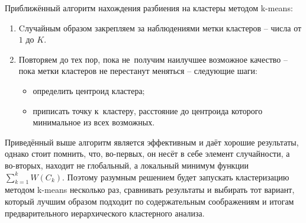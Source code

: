 \documentclass[12pt,a4paper]{article}
\theoremstyle{definition}
\begin{document}
Приближённый алгоритм нахождения разбиения на кластеры методом k-means:

\begin{enumerate}
\item Cлучайным образом закрепляем за наблюдениями метки 
кластеров -- числа от $1$ до $K$. 
\item Повторяем до тех пор, пока не~получим наилучшее возможное качество -- пока 
метки кластеров не перестанут меняться -- следующие шаги:

\begin{itemize}
\item определить центроид кластера;
\item приписать точку к~кластеру, расстояние до центроида 
которого минимальное из всех возможных. 
\end{itemize}
\end{enumerate}

Приведённый выше алгоритм является эффективным и 
даёт хорошие результаты, однако стоит помнить, что, во-первых, 
он несёт в себе элемент случайности, а во-вторых, находит не глобальный, 
а локальный минимум функции $\sum^k_{k=1} W(C_k)$. Поэтому 
разумным решением будет запускать кластеризацию методом k-means 
несколько раз, сравнивать результаты и выбирать тот вариант, который лучшим 
образом подходит по содержательным соображениям и итогам 
предварительного иерархического кластерного анализа.
\end{document}
